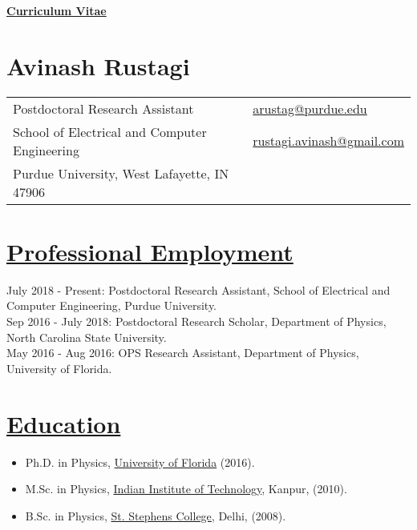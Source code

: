 \documentclass[11pt]{article}
\providecommand*\email[1]{\href{mailto:#1}{#1}}
\begin{document}
\begin{center}
{\bf \underline{Curriculum Vitae}}
\end{center}

 \section*{Avinash Rustagi}
\newlength{\rcollength}\setlength{\rcollength}{2.13in}
\begin{tabular}[t]{@{}p{\textwidth-\rcollength}p{\rcollength}}
Postdoctoral Research Assistant & \email{arustag@purdue.edu} \\ 
School of Electrical and Computer Engineering & \email{rustagi.avinash@gmail.com} \\ 
Purdue University, West Lafayette, IN 47906 & \\
\end{tabular} 

\renewcommand{\labelitemii}{$\cdot$}
\section*{\underline{Professional Employment}}
July 2018 - Present: Postdoctoral Research Assistant, School of Electrical and Computer Engineering, Purdue University.\\

Sep 2016 - July 2018: Postdoctoral Research Scholar, Department of Physics, North Carolina State University. \\

May 2016 - Aug 2016: OPS Research Assistant, Department of Physics, University of Florida.


\section*{\underline{Education}}
\begin{itemize}
\item{Ph.D. in Physics, \href{http://www.phys.ufl.edu}{ University of Florida} (2016).}
\item{M.Sc. in Physics, \href{http://www.iitk.ac.in/phy/} {Indian Institute of Technology}, Kanpur, (2010).}
\item{B.Sc. in Physics, \href{http://www.ststephens.edu} {St. Stephens College}, Delhi, (2008).}
\end{itemize}
\end{document}
